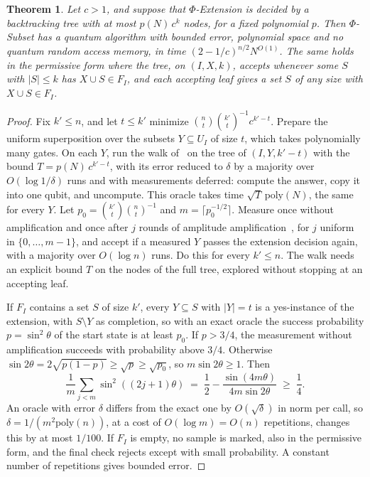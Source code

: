 \documentclass[11pt]{article}
\newtheorem{theorem}{Theorem}[section]
\theoremstyle{remark}
\newcommand{\poly}{\mathrm{poly}}
\begin{document}
\begin{theorem}\label{thm:mls}
Let $c > 1$, and suppose that $\Phi$-Extension is decided by a backtracking tree with at most $p(N)\,c^k$ nodes, for a fixed polynomial $p$. Then $\Phi$-Subset has a quantum algorithm with bounded error, polynomial space and no quantum random access memory, in time $(2 - 1/c)^{n/2} N^{O(1)}$. The same holds in the permissive form where the tree, on $(I, X, k)$, accepts whenever some $S$ with $|S| \le k$ has $X \cup S \in F_I$, and each accepting leaf gives a set $S$ of any size with $X \cup S \in F_I$.
\end{theorem}

\begin{proof}
Fix $k' \le n$, and let $t \le k'$ minimize $\binom{n}{t}\binom{k'}{t}^{-1} c^{k'-t}$. Prepare the uniform superposition over the subsets $Y \subseteq U_I$ of size $t$, which takes polynomially many gates. On each $Y$, run the walk of~\cite{Mon18} on the tree of $(I, Y, k'-t)$ with the bound $T = p(N)\,c^{k'-t}$, with its error reduced to $\delta$ by a majority over $O(\log 1/\delta)$ runs and with measurements deferred: compute the answer, copy it into one qubit, and uncompute. This oracle takes time $\sqrt{T}\,\poly(N)$, the same for every $Y$. Let $p_0 = \binom{k'}{t}\binom{n}{t}^{-1}$ and $m = \lceil p_0^{-1/2} \rceil$. Measure once without amplification and once after $j$ rounds of amplitude amplification~\cite{BBHT98,BHMT02}, for $j$ uniform in $\{0, \dots, m-1\}$, and accept if a measured $Y$ passes the extension decision again, with a majority over $O(\log n)$ runs. Do this for every $k' \le n$. The walk needs an explicit bound $T$ on the nodes of the full tree, explored without stopping at an accepting leaf.

If $F_I$ contains a set $S$ of size $k'$, every $Y \subseteq S$ with $|Y| = t$ is a yes-instance of the extension, with $S \setminus Y$ as completion, so with an exact oracle the success probability $p = \sin^2\theta$ of the start state is at least $p_0$. If $p > 3/4$, the measurement without amplification succeeds with probability above $3/4$. Otherwise $\sin 2\theta = 2\sqrt{p(1-p)} \ge \sqrt{p} \ge \sqrt{p_0}$, so $m \sin 2\theta \ge 1$. Then
\[
\frac{1}{m}\sum_{j<m} \sin^2((2j+1)\theta) \;=\; \frac12 - \frac{\sin(4m\theta)}{4m\sin 2\theta} \;\ge\; \frac14 .
\]
An oracle with error $\delta$ differs from the exact one by $O(\sqrt{\delta})$ in norm per call, so $\delta = 1/(m^2\poly(n))$, at a cost of $O(\log m) = O(n)$ repetitions, changes this by at most $1/100$. If $F_I$ is empty, no sample is marked, also in the permissive form, and the final check rejects except with small probability. A constant number of repetitions gives bounded error.


\end{proof}
\end{document}
